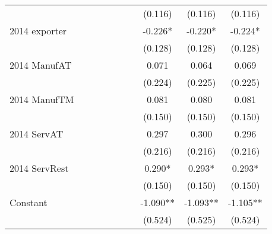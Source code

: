 \begin{table}[htbp]
\begin{tabular}{l*{9}{c}}
                    &               &               &               &               &               &               &     (0.116)   &     (0.116)   &     (0.116)   \\
2014 exporter       &               &               &               &               &               &               &      -0.226*  &      -0.220*  &      -0.224*  \\
                    &               &               &               &               &               &               &     (0.128)   &     (0.128)   &     (0.128)   \\
2014 ManufAT        &               &               &               &               &               &               &       0.071   &       0.064   &       0.069   \\
                    &               &               &               &               &               &               &     (0.224)   &     (0.225)   &     (0.225)   \\
2014 ManufTM        &               &               &               &               &               &               &       0.081   &       0.080   &       0.081   \\
                    &               &               &               &               &               &               &     (0.150)   &     (0.150)   &     (0.150)   \\
2014 ServAT         &               &               &               &               &               &               &       0.297   &       0.300   &       0.296   \\
                    &               &               &               &               &               &               &     (0.216)   &     (0.216)   &     (0.216)   \\
2014 ServRest       &               &               &               &               &               &               &       0.290*  &       0.293*  &       0.293*  \\
                    &               &               &               &               &               &               &     (0.150)   &     (0.150)   &     (0.150)   \\
Constant            &               &               &               &               &               &               &      -1.090** &      -1.093** &      -1.105** \\
                    &               &               &               &               &               &               &     (0.524)   &     (0.525)   &     (0.524)   \\

\end{tabular}
\end{table}
